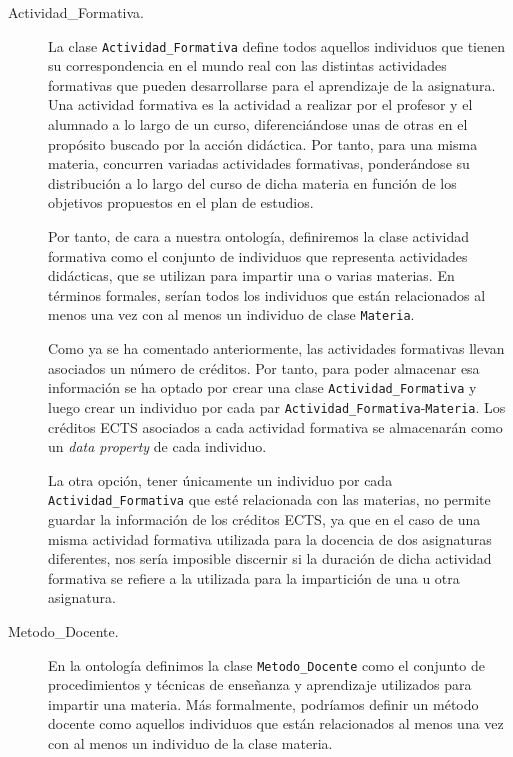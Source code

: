 \begin{description}
      
		\item[Actividad\_Formativa.]La clase \lstinline!Actividad_Formativa! define todos aquellos individuos que tienen su correspondencia en el mundo real con las distintas actividades formativas que pueden desarrollarse para el aprendizaje de la asignatura. Una actividad formativa es la actividad a realizar por el profesor y el alumnado a lo largo de un curso, diferenciándose unas de otras en el propósito buscado por la acción didáctica. Por tanto, para una misma materia, concurren variadas actividades formativas, ponderándose su distribución a lo largo del curso de dicha materia en función de los objetivos propuestos en el plan de estudios.
		
		Por tanto, de cara a nuestra ontología, definiremos la clase actividad formativa como el conjunto de individuos que representa actividades didácticas, que se utilizan  para impartir una o varias materias. En términos formales, serían todos los individuos que están relacionados al menos una vez con al menos un individuo de clase \lstinline!Materia!. 
		
		Como ya se ha comentado anteriormente, las actividades formativas llevan asociados un número de créditos. Por tanto, para poder almacenar esa información se ha optado por crear una clase \lstinline!Actividad_Formativa! y luego crear un individuo por cada par \lstinline!Actividad_Formativa!-\lstinline!Materia!. Los créditos ECTS asociados a cada actividad formativa se almacenarán como un \textit{data property} de cada individuo. 
		
		La otra opción, tener únicamente un individuo por cada \lstinline!Actividad_Formativa! que esté relacionada con las materias, no permite guardar la información de los créditos ECTS, ya que en el caso de una misma actividad formativa utilizada para la docencia de dos asignaturas diferentes, nos sería imposible discernir si la duración de dicha actividad formativa se refiere a la utilizada para la impartición de una u otra asignatura.
			

		\item[Metodo\_Docente.]En la ontología definimos la clase \lstinline!Metodo_Docente! como el conjunto de procedimientos y técnicas de enseñanza y aprendizaje utilizados para impartir una materia. Más formalmente, podríamos definir un método docente como aquellos individuos que están relacionados al menos una vez con al menos un individuo de la clase materia. 
			



\end{description}
